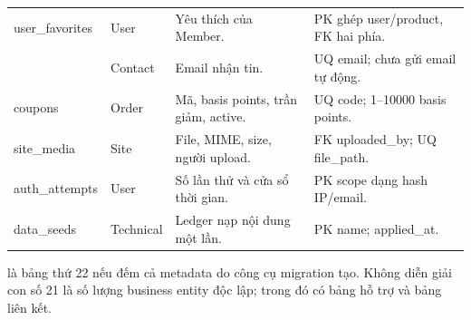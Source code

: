 {\begin{longtable}{@{}P{3.1cm}P{2cm}P{4.8cm}P{4.6cm}@{}}
user\_favorites & User & Yêu thích của Member. & PK ghép user/product, FK hai phía.\\
 & Contact & Email nhận tin. & UQ email; chưa gửi email tự động.\\
coupons & Order & Mã, basis points, trần giảm, active. & UQ code; 1–10000 basis points.\\
site\_media & Site & File, MIME, size, người upload. & FK uploaded\_by; UQ file\_path.\\
auth\_attempts & User & Số lần thử và cửa sổ thời gian. & PK scope dạng hash IP/email.\\
data\_seeds & Technical & Ledger nạp nội dung một lần. & PK name; applied\_at.\\
\bottomrule\end{longtable}}
 là bảng thứ 22 nếu đếm cả metadata do công cụ migration tạo. Không diễn giải con số 21 là số lượng business entity độc lập; trong đó có bảng hỗ trợ và bảng liên kết.

